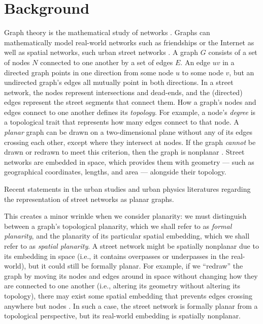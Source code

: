 \documentclass[Afour,sageh,times]{sagej}
\begin{document}
\section{Background}

Graph theory is the mathematical study of networks \citep{newman_networks:_2010}. Graphs can mathematically model real-world networks such as friendships or the Internet as well as spatial networks, such urban street networks \citep{barthelemy_spatial_2011}. A graph $G$ consists of a set of nodes $N$ connected to one another by a set of edges $E$. An edge $uv$ in a directed graph points in one direction from some node $u$ to some node $v$, but an undirected graph's edges all mutually point in both directions. In a street network, the nodes represent intersections and dead-ends, and the (directed) edges represent the street segments that connect them. How a graph's nodes and edges connect to one another defines its \emph{topology}. For example, a node's \emph{degree} is a topological trait that represents how many edges connect to that node. A \emph{planar} graph can be drawn on a two-dimensional plane without any of its edges crossing each other, except where they intersect at nodes. If the graph \emph{cannot} be drawn or redrawn to meet this criterion, then the graph is nonplanar \citep{trudeau_introduction_1994}. Street networks are embedded in space, which provides them with geometry --- such as geographical coordinates, lengths, and area --- alongside their topology.

\begin{table}[htbp]
\centering
\caption{Recent statements in the urban studies and urban physics literatures regarding the representation of street networks as planar graphs.}
\label{tab:planar_quotes}

\end{table}

This creates a minor wrinkle when we consider planarity: we must distinguish between a graph's topological planarity, which we shall refer to as \emph{formal planarity}, and the planarity of its particular spatial embedding, which we shall refer to as \emph{spatial planarity}. A street network might be spatially nonplanar due to its embedding in space (i.e., it contains overpasses or underpasses in the real-world), but it could still be formally planar. For example, if we \enquote{redraw} the graph by moving its nodes and edges around in space without changing how they are connected to one another (i.e., altering its geometry without altering its topology), there may exist some spatial embedding that prevents edges crossing anywhere but nodes \citep[for a more comprehensive discussion see][pp.~6--10]{barthelemy_morphogenesis_2017}. In such a case, the street network is formally planar from a topological perspective, but its real-world embedding is spatially nonplanar.
\end{document}
